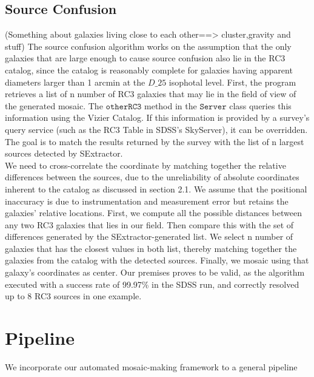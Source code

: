 \documentclass[5p]{elsarticle}
\begin{document}
	\subsection{Source Confusion}
	(Something about galaxies living close to each other==> cluster,gravity and stuff)
\indent The source confusion algorithm works on the assumption that the only galaxies that are large enough to cause source confusion also lie in the RC3 catalog, since the catalog is reasonably complete for galaxies having apparent diameters larger than 1 arcmin at the $D\_25$ isophotal level. First, the program retrieves a list of n number of RC3 galaxies that may lie in the field of view of the generated mosaic. The $\texttt{otherRC3}$ method in the $\texttt{Server}$ class queries this information using the Vizier Catalog. If this information is provided by a survey's query service (such as the RC3 Table in SDSS's SkyServer), it can be overridden. The goal is to match the results returned by the survey with the list of n largest sources detected by SExtractor. 
\\
\indent  We need to cross-correlate the coordinate by matching together the relative differences between the sources, due to the unreliability of absolute coordinates inherent to the catalog as discussed in section 2.1. We assume that the positional inaccuracy is due to  instrumentation and measurement error but retains the galaxies' relative locations.  %
First, we compute all the possible distances between any two RC3 galaxies that lies in our field. Then compare this with the set of differences generated by the SExtractor-generated list. We select n number of galaxies that has the closest values in both list, thereby matching together the galaxies from the catalog  with the detected sources. Finally, we mosaic using that galaxy's coordinates as center. Our premises proves to be valid, as the algorithm executed with a success rate of 99.97\% in the SDSS run, and correctly resolved up to 8 RC3 sources in one example.

	

\section{Pipeline}
We incorporate our automated mosaic-making framework to a general pipeline
\end{document}
